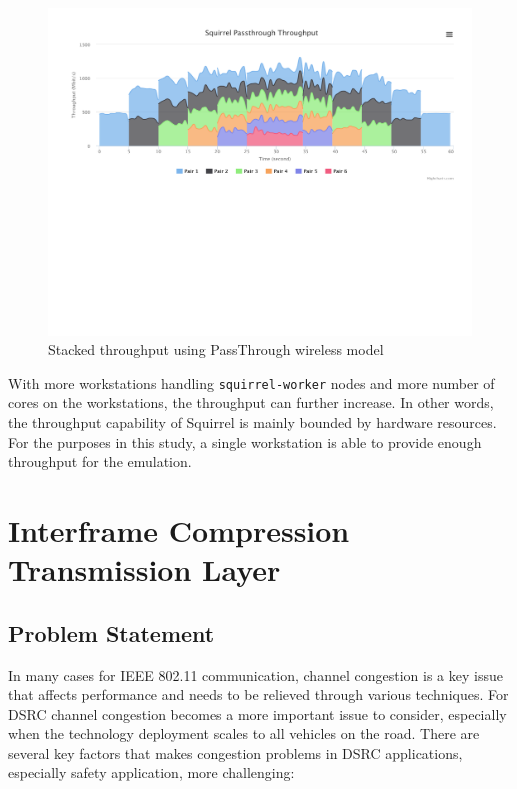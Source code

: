 \documentclass[12pt]{report}
\begin{document}
\begin{figure}[h]
  \includegraphics[width=\textwidth]{figures/results/passthrough.pdf}
  \caption{\label{fig:passthrough}Stacked throughput using PassThrough wireless model}
\end{figure}

With more workstations handling \texttt{squirrel-worker} nodes and more number of cores on the workstations, the throughput can further increase. In other words, the throughput capability of Squirrel is mainly bounded by hardware resources. For the purposes in this study, a single workstation is able to provide enough throughput for the emulation.

\chapter{Interframe Compression Transmission Layer}

\section{Problem Statement}
\label{sec:problem_congestion}

In many cases for IEEE 802.11 communication, channel congestion is a key issue that affects performance and needs to be relieved through various techniques. For DSRC channel congestion becomes a more important issue to consider, especially when the technology deployment scales to all vehicles on the road. There are several key factors that makes congestion problems in DSRC applications, especially safety application, more challenging:
\end{document}
